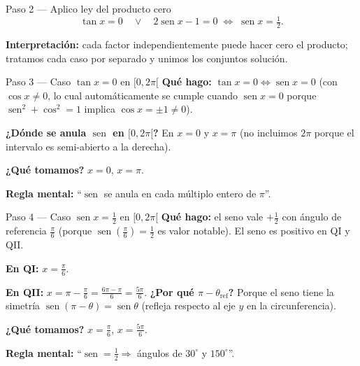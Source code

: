 \documentclass[11pt]{article}
\DeclareMathOperator{\sen}{sen}
\begin{document}

\begin{paso}{Paso 2 --- Aplico ley del producto cero}
\[
\tan x = 0 \quad\lor\quad 2\sen x-1=0 \;\Longleftrightarrow\; \sen x=\tfrac{1}{2}.
\]

\textbf{Interpretación:} cada factor independientemente puede hacer cero el producto; tratamos cada caso por separado y unimos los conjuntos solución.
\end{paso}

\begin{paso}{Paso 3 --- Caso $\tan x=0$ en $[0,2\pi[$}
\textbf{Qué hago:} $\tan x=0\Leftrightarrow \sen x=0$ (con $\cos x\neq 0$, lo cual automáticamente se cumple cuando $\sen x=0$ porque $\sen^2+\cos^2=1$ implica $\cos x=\pm 1\neq 0$).

\textbf{¿Dónde se anula $\sen$ en $[0,2\pi[$?} En $x=0$ y $x=\pi$ (no incluimos $2\pi$ porque el intervalo es semi-abierto a la derecha).

\textbf{¿Qué tomamos?} $x=0$, $x=\pi$.

\textbf{Regla mental:} ``$\sen$ se anula en cada múltiplo entero de $\pi$''.
\end{paso}

\begin{paso}{Paso 4 --- Caso $\sen x=\tfrac{1}{2}$ en $[0,2\pi[$}
\textbf{Qué hago:} el seno vale $+\tfrac{1}{2}$ con ángulo de referencia $\tfrac{\pi}{6}$ (porque $\sen(\tfrac{\pi}{6})=\tfrac{1}{2}$ es valor notable). El seno es positivo en QI y QII.

\textbf{En QI:} $x=\tfrac{\pi}{6}$.

\textbf{En QII:} $x=\pi-\tfrac{\pi}{6}=\tfrac{6\pi-\pi}{6}=\tfrac{5\pi}{6}$. \textbf{¿Por qué $\pi-\theta_{\text{ref}}$?} Porque el seno tiene la simetría $\sen(\pi-\theta)=\sen\theta$ (refleja respecto al eje $y$ en la circunferencia).

\textbf{¿Qué tomamos?} $x=\tfrac{\pi}{6}$, $x=\tfrac{5\pi}{6}$.

\textbf{Regla mental:} ``$\sen=\tfrac{1}{2}\Rightarrow$ ángulos de $30^\circ$ y $150^\circ$''.
\end{paso}
\end{document}
